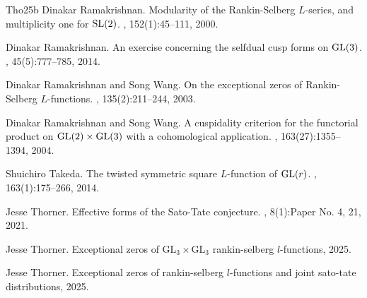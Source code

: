 \documentclass[12pt]{amsart}
\begin{document}
\begin{thebibliography}{Tho25b}
Dinakar Ramakrishnan.
\newblock Modularity of the {R}ankin-{S}elberg {$L$}-series, and multiplicity one for {${\rm SL}(2)$}.
, 152(1):45--111, 2000.

Dinakar Ramakrishnan.
\newblock An exercise concerning the selfdual cusp forms on {${\rm GL}(3)$}.
, 45(5):777--785, 2014.

Dinakar Ramakrishnan and Song Wang.
\newblock On the exceptional zeros of {R}ankin-{S}elberg {$L$}-functions.
, 135(2):211--244, 2003.

Dinakar Ramakrishnan and Song Wang.
\newblock A cuspidality criterion for the functorial product on {$\rm GL(2)\times GL(3)$} with a cohomological application.
, 163(27):1355--1394, 2004.

Shuichiro Takeda.
\newblock The twisted symmetric square {$L$}-function of {${\rm GL}(r)$}.
, 163(1):175--266, 2014.

Jesse Thorner.
\newblock Effective forms of the {S}ato-{T}ate conjecture.
, 8(1):Paper No. 4, 21, 2021.

Jesse Thorner.
\newblock Exceptional zeros of $\mathrm{GL}_3\times\mathrm{GL}_3$ rankin-selberg $l$-functions, 2025.

Jesse Thorner.
\newblock Exceptional zeros of rankin-selberg $l$-functions and joint sato-tate distributions, 2025.

\end{thebibliography}
\end{document}
